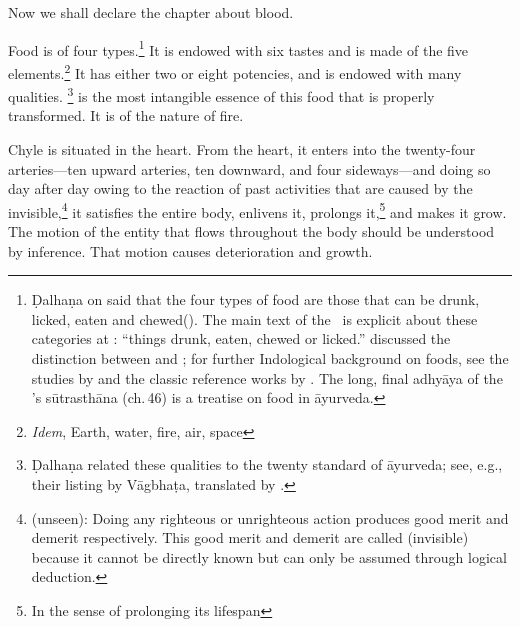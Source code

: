 \begin{translation}    
\item [1] Now we shall declare the chapter about blood.

\item [2]

    
\item [3] Food is of four types.\footnote{Ḍalhaṇa on  said
    that the four types of food are those that can be drunk, licked, eaten
    and chewed(). The main text of the \CS\ is
    explicit about these categories at :
     “things drunk, eaten, chewed or licked.”
    \citet{yagi-1994} discussed the distinction between  and
    ; for further Indological background on foods, see the
    studies by \citet{oliv-1995,oliv-2001} and the classic reference works by
    \citet{acha-1994,acha-1998}. The long, final adhyāya of the
    \SS's sūtrasthāna (ch.\,46) is a treatise on food in āyurveda.} It is endowed 
    with six tastes and is made
    of the five elements.\footnote{\emph{Idem}, Earth, water, fire, air,
        space} It has either two or eight potencies, and is endowed with many
        qualities. \footnote{Ḍalhaṇa related these qualities to the twenty
            standard  of āyurveda; see, e.g., their listing by Vāgbhaṭa,
            translated by \citet[207]{wuja-2003}. }
             is the most intangible essence of this food that is
            properly transformed. It is of the nature of fire.
                
Chyle is situated in the heart. From the heart, it enters into the
twenty-four arteries—ten upward arteries, ten downward, and four
sideways—and doing so day after day owing to the reaction of past
activities that are caused by the invisible,\footnote{
    (unseen): Doing any righteous or unrighteous action produces good merit
    and demerit respectively. This good merit and demerit are called
     (invisible) because it cannot be directly known but can only
    be assumed through logical deduction.} it satisfies the entire body,
    enlivens it, prolongs it,\footnote{In the sense of prolonging its
        lifespan} and makes it grow. The motion of the entity that flows
        throughout the body should be understood by inference. That motion causes
        deterioration and growth.
    

\end{translation}
